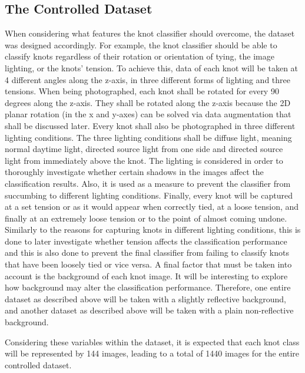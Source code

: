 \documentclass{l4proj}
\begin{document}
\subsection{The Controlled Dataset}
When considering what features the knot classifier should overcome, the dataset was designed accordingly.
For example, the knot classifier should be able to classify knots regardless of their rotation or orientation of tying, the image lighting, or the knots' tension.
To achieve this, data of each knot will be taken at 4 different angles along the z-axis, in three different forms of lighting and three tensions.
When being photographed, each knot shall be rotated for every 90 degrees along the z-axis.
They shall be rotated along the z-axis because the 2D planar rotation (in the x and y-axes) can be solved via data augmentation that shall be discussed later.
Every knot shall also be photographed in three different lighting conditions.
The three lighting conditions shall be diffuse light, meaning normal daytime light, directed source light from one side and directed source light from immediately above the knot.
The lighting is considered in order to thoroughly investigate whether certain shadows in the images affect the classification results.
Also, it is used as a measure to prevent the classifier from succumbing to different lighting conditions.
Finally, every knot will be captured at a set tension or as it would appear when correctly tied, at a loose tension, and finally at an extremely loose tension or to the point of almost coming undone.
Similarly to the reasons for capturing knots in different lighting conditions, this is done to later investigate whether tension affects the classification performance and this is also done to prevent the final classifier from failing to classify knots that have been loosely tied or vice versa.
A final factor that must be taken into account is the background of each knot image.
It will be interesting to explore how background may alter the classification performance. 
Therefore, one entire dataset as described above will be taken with a slightly reflective background, and another dataset as described above will be taken with a plain non-reflective background.

Considering these variables within the dataset, it is expected that each knot class will be represented by 144 images, leading to a total of 1440 images for the entire controlled dataset.
\end{document}
